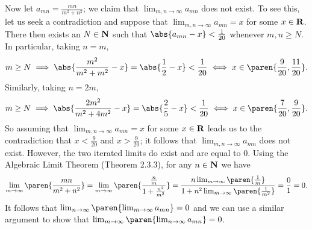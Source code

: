 \documentclass{lew98_solutions}
\begin{document}
\begin{solution}
\begin{enumerate}
        Now let \( a_{mn} = \tfrac{mn}{m^2 + n^2} \); we claim that \( \lim_{m, n \to \infty} a_{mn} \) does not exist. To see this, let us seek a contradiction and suppose that \( \lim_{m, n \to \infty} a_{mn} = x \) for some \( x \in \mathbf{R} \). There then exists an \( N \in \mathbf{N} \) such that \( \abs{a_{mn} - x} < \tfrac{1}{20} \) whenever \( m, n \geq N \). In particular, taking \( n = m \),
        \[
            m \geq N \implies \abs{\frac{m^2}{m^2 + m^2} - x} = \abs{\frac{1}{2} - x} < \frac{1}{20} \iff x \in \paren{ \frac{9}{20}, \frac{11}{20} }.
        \]
        Similarly, taking \( n = 2m \),
        \[
            m \geq N \implies \abs{\frac{2m^2}{m^2 + 4m^2} - x} = \abs{\frac{2}{5} - x} < \frac{1}{20} \iff x \in \paren{ \frac{7}{20}, \frac{9}{20} }.
        \]
        So assuming that \( \lim_{m, n \to \infty} a_{mn} = x \) for some \( x \in \mathbf{R} \) leads us to the contradiction that \( x < \tfrac{9}{20} \) and \( x > \tfrac{9}{20} \); it follows that \( \lim_{m, n \to \infty} a_{mn} \) does not exist. However, the two iterated limits do exist and are equal to 0. Using the Algebraic Limit Theorem (Theorem 2.3.3), for any \( n \in \mathbf{N} \) we have
        \[
            \lim_{m \to \infty} \paren{ \frac{mn}{m^2 + n^2} } = \lim_{m \to \infty} \paren{ \frac{\frac{n}{m}}{1 + \frac{n^2}{m^2}} } = \frac{n \lim_{m \to \infty} \paren{ \frac{1}{m} }}{1 + n^2 \lim_{m \to \infty} \paren{ \frac{1}{m^2} }} = \frac{0}{1} = 0.
        \]
        It follows that \( \lim_{n \to \infty} \paren{ \lim_{m \to \infty} a_{mn} } = 0 \) and we can use a similar argument to show that \( \lim_{m \to \infty} \paren{ \lim_{n \to \infty} a_{mn} } = 0 \).


\end{enumerate}
\end{solution}
\end{document}
